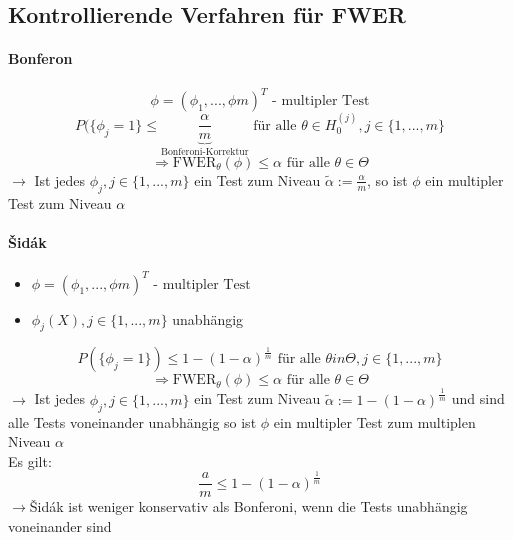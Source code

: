 \documentclass[10pt]{report}
\theoremstyle{definition}
\begin{document}
\subsection{Kontrollierende Verfahren für FWER}
\paragraph{Bonferon}
\[ \phi = (\phi_{1},...,\phi{m})^T \text{  - multipler Test} \]
\[ P(\{\phi_j = 1\} \leq \underbrace{\frac{\alpha}{m}}_{\text{Bonferoni-Korrektur}} \text{ für alle } \theta \in H_0^{(j)}, j \in \{1,...,m\} \]
\[ \Rightarrow \text{FWER}_{\theta}(\phi) \leq \alpha \text{ für alle }\theta \in \Theta \]
$\rightarrow$ Ist jedes $\phi_j, j \in \{1,...,m\}$ ein Test zum Niveau $\tilde{\alpha} := \frac{\alpha}{m}$, so ist $\phi$ ein multipler Test zum Niveau $\alpha$

\paragraph{\v Sid\'ak}
\begin{itemize}
 \item $ \phi = (\phi_{1},...,\phi{m})^T \text{  - multipler Test} $
 \item $\phi_j (X), j \in \{1,...,m \}$ unabhängig
\end{itemize}
\[ P(\{\phi_j = 1\} ) \leq 1-(1-\alpha)^{\frac{1}{m}} \text{ für alle } \theta in \Theta, j \in \{1,...,m\}\]
\[ \Rightarrow \text{FWER}_{\theta}(\phi) \leq \alpha \text{ für alle }\theta \in \Theta \]
$\rightarrow$ Ist jedes $\phi_j, j \in \{1,...,m\}$ ein Test zum Niveau $\tilde{\alpha} := 1-(1-\alpha)^{\frac{1}{m}}$ und sind alle Tests voneinander unabhängig so ist $\phi$ ein multipler Test zum multiplen Niveau $\alpha$ \\
Es gilt:
\[ \frac{a}{m} \leq 1-(1-\alpha)^{\frac{1}{m}} \]
$\rightarrow$\v Sid\'ak ist weniger konservativ als Bonferoni, wenn die Tests unabhängig voneinander sind \\
\end{document}
